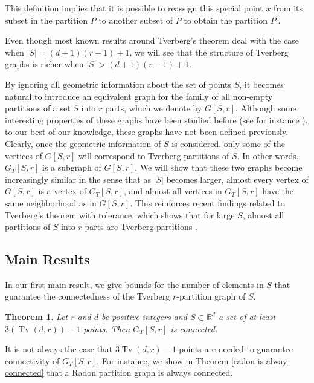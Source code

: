 \documentclass[11pt,a4paper]{article}
\theoremstyle{plain}
\newtheorem{theorem}{Theorem}[section]
\theoremstyle{definition}
\newcommand{\rr}{\mathds{R}}
\newcommand{\tv}{\operatorname{Tv}}
\begin{document}
This definition implies that it is possible to reassign this special point $x$ from its subset in the partition $P$ to another subset of $P$ to obtain the partition $P^{\prime}$.   

Even though most known results around Tverberg's theorem deal with the case when $|S|=(d+1)(r-1)+1$, we will see that the structure of Tverberg graphs is richer when $|S|>(d+1)(r-1)+1$.

By ignoring all geometric information about the set of points $S$, it becomes natural to introduce an equivalent graph for the family of all non-empty partitions of a set $S$ into $r$ parts, which we denote by $G[S,r]$. Although some interesting properties of these graphs have been studied before (see for instance \cite{regnier1983quelques, almudevar1999estimation, konovalov2005partition}),  to our best of our knowledge, these graphs have not been defined previously.  Clearly, once the geometric information of $S$ is considered, only some of the vertices of $G[S,r]$ will correspond to Tverberg partitions of $S$. In other words, $G_T[S,r]$ is a subgraph of $G[S,r]$. We will show that these two graphs become increasingly similar in the sense that as $|S|$ becomes larger, almost every vertex of $G[S,r]$ is a vertex of $G_T[S,r]$, and almost all vertices in $G_T[S,r]$ have the same neighborhood as in $G[S,r]$. This reinforces recent findings related to Tverberg's theorem with tolerance, which shows that for large $S$, almost all partitions of $S$ into $r$ parts are Tverberg partitions \cite{Soberon:2018gn}.

\subsection{Main Results}

In our first main result, we give bounds for the number of elements in $S$ that guarantee the connectedness of the Tverberg $r$-partition graph of $S$. 

\begin{theorem}\label{generalconnected}
 Let $r$ and $d$ be positive integers and $S \subset \rr^d$ a set of at least $3(\tv(d,r))-1$ points. 
 Then $G_T[S,r]$ is connected.
 \end{theorem}

 It is not always the case that $3\tv(d,r)-1$ points are needed to guarantee connectivity of $G_T[S,r]$. For instance, we show in Theorem \ref{radon is alway connected} that a Radon partition graph is always connected.
 
\end{document}
